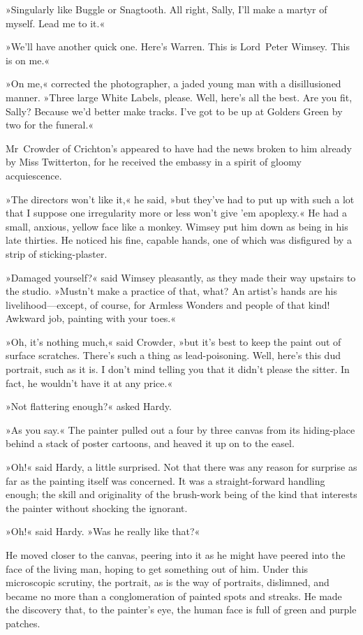 »Singularly like Buggle or Snagtooth. All right, Sally, I'll make a martyr of myself. Lead me to it.«

»We'll have another quick one. Here's Warren. This is Lord~Peter Wimsey. This is on me.«

»On me,« corrected the photographer, a jaded young man with a disillusioned manner. »Three large White Labels, please. Well, here's all the best. Are you fit, Sally? Because we'd better make tracks. I've got to be up at Golders Green by two for the funeral.«

Mr~Crowder of Crichton's appeared to have had the news broken to him already by Miss Twitterton, for he received the embassy in a spirit of gloomy acquiescence.

»The directors won't like it,« he said, »but they've had to put up with such a lot that I suppose one irregularity more or less won't give 'em apoplexy.« He had a small, anxious, yellow face like a monkey. Wimsey put him down as being in his late thirties. He noticed his fine, capable hands, one of which was disfigured by a strip of sticking-plaster.

»Damaged yourself?« said Wimsey pleasantly, as they made their way upstairs to the studio. »Mustn't make a practice of that, what? An artist's hands are his livelihood—except, of course, for Armless Wonders and people of that kind! Awkward job, painting with your toes.«

»Oh, it's nothing much,« said Crowder, »but it's best to keep the paint out of surface scratches. There's such a thing as lead-poisoning. Well, here's this dud portrait, such as it is. I don't mind telling you that it didn't please the sitter. In fact, he wouldn't have it at any price.«

»Not flattering enough?« asked Hardy.

»As you say.« The painter pulled out a four by three canvas from its hiding-place behind a stack of poster cartoons, and heaved it up on to the easel.

»Oh!« said Hardy, a little surprised. Not that there was any reason for surprise as far as the painting itself was concerned. It was a straight-forward handling enough; the skill and originality of the brush-work being of the kind that interests the painter without shocking the ignorant.

»Oh!« said Hardy. »Was he really like that?«

He moved closer to the canvas, peering into it as he might have peered into the face of the living man, hoping to get something out of him. Under this microscopic scrutiny, the portrait, as is the way of portraits, dislimned, and became no more than a conglomeration of painted spots and streaks. He made the discovery that, to the painter's eye, the human face is full of green and purple patches.

